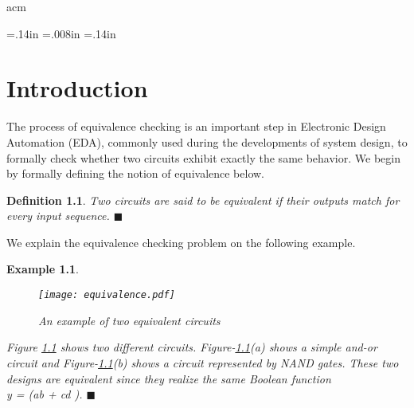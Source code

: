 

 {acm}


\newtheorem {theorem} {Theorem} [chapter]
\newtheorem {lemma} {Lemma} [chapter]
\newtheorem {corollary} {Corollary} [chapter]
\newtheorem{example}{Example}[chapter]
\newtheorem{definition}{Definition}[chapter]
\newtheorem{defn}{Definition}[chapter]
\newtheorem{result}{Result}[chapter]
\newtheorem{observation}{Observation}[chapter]
\newtheorem{proposition}{Proposition}[chapter]
\newtheorem{assumption}{Assumption}[chapter]


%
%
\newpage
\newpage


\parskip=.14in
\parskip=.008in
%
\parskip=.14in
\newpage

\tableofcontents
\newpage
\listoffigures
\newpage
\newpage




%



\chapter{Introduction}
\par The process of equivalence checking is an important step in Electronic Design Automation (EDA), commonly used during the developments
of system design, to formally check whether two circuits exhibit exactly the 
same behavior. We begin by formally defining the notion of equivalence below.

\begin{defn}
Two circuits are said to be equivalent if their outputs match for every input sequence. 
$\blacksquare$
\end{defn}
\noindent
We explain the equivalence checking problem on the following example.

\begin{example}
\begin{figure}[!h]
\centering
\texttt{[image: equivalence.pdf]}
\caption{An example of two equivalent circuits} \label{fig1}
\end{figure}

Figure \ref{fig1} shows two different circuits. Figure-\ref{fig1}(a) shows a simple and-or circuit and Figure-\ref{fig1}(b) shows a circuit
represented by NAND gates. These two designs are equivalent since they realize the same Boolean function \\ y = (ab + cd ).
$\blacksquare$
\end{example}

